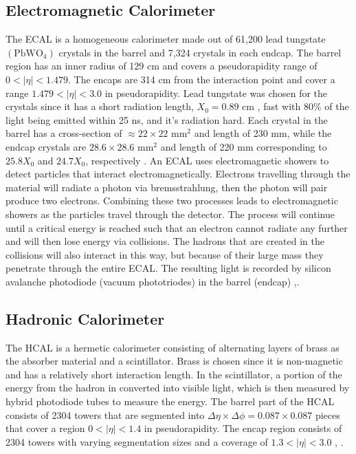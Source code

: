 \subsection{Electromagnetic Calorimeter}
\label{sec:ECAL}

The ECAL is a homogeneous calorimeter made out of 61,200 lead tungstate $(\text{PbWO}_4)$ crystals in the barrel and 7,324 crystals in each endcap. The barrel region has an inner radius of 129 cm and covers a pseudorapidity range of $0<|\eta|<1.479$. The encaps are 314 cm from the interaction point and cover a range $1.479<|\eta|<3.0$ in pseudorapidity. Lead tungstate was chosen for the crystals since it has a short radiation length, $X_0=0.89 \text{ cm }$, fast with 80\% of the light being emitted within 25 ns, and it's radiation hard. Each crystal in the barrel has a cross-section of $\approx22\times22 \text{ mm}^2$ and length of 230 mm, while the endcap crystals are $28.6\times28.6 \text{ mm}^2$ and length of 220 mm corresponding to $25.8X_0$ and $24.7X_0$, respectively \cite{noauthor_cms_1997}. An ECAL uses electromagnetic showers to detect particles that interact electromagnetically. Electrons travelling through the material will radiate a photon via bremsstrahlung, then the photon will pair produce two electrons. Combining these two processes leads to electromagnetic showers as the particles travel through the detector. The process will continue until a critical energy is reached such that an electron cannot radiate any further and will then lose energy via collisions. The hadrons that are created in the collisions will also interact in this way, but because of their large mass they penetrate through the entire ECAL. The resulting light is recorded by silicon avalanche photodiode (vacuum phototriodes) in the barrel (endcap) \cite{noauthor_cms_1997},\cite{collaboration_cms_2007}. 

\subsection{Hadronic Calorimeter}
\label{sec:HCAL}

The HCAL is a hermetic calorimeter consisting of alternating layers of brass as the absorber material and a scintillator. Brass is chosen since it is non-magnetic and has a relatively short interaction length. In the scintillator, a portion of the energy from the hadron in converted into visible light, which is then measured by hybrid photodiode tubes to measure the energy. The barrel part of the HCAL consists of 2304 towers that are segmented into $\Delta\eta\times\Delta\phi=0.087\times0.087$ pieces that cover a region $0<|\eta|<1.4$ in pseudorapidity. The encap region consists of 2304 towers with varying segmentation sizes and a coverage of $1.3<|\eta|<3.0$ \cite{noauthor_cms_1997-1}, \cite{collaboration_cms_2007}. 

